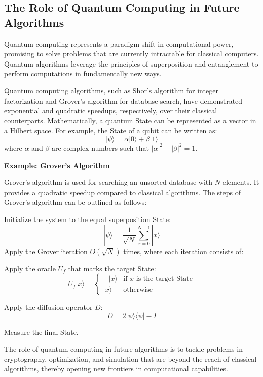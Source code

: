 \documentclass[12pt]{book} %
\begin{document}
\subsection{The Role of Quantum Computing in Future Algorithms}
Quantum computing represents a paradigm shift in computational power, promising to solve problems that are currently intractable for classical computers. Quantum algorithms leverage the principles of superposition and entanglement to perform computations in fundamentally new ways.

Quantum computing algorithms, such as Shor's algorithm for integer factorization and Grover's algorithm for database search, have demonstrated exponential and quadratic speedups, respectively, over their classical counterparts. Mathematically, a quantum State can be represented as a vector in a Hilbert space. For example, the State of a qubit can be written as:
\[
|\psi\rangle = \alpha |0\rangle + \beta |1\rangle
\]
where \(\alpha\) and \(\beta\) are complex numbers such that \(|\alpha|^2 + |\beta|^2 = 1\).

\textbf{Example: Grover's Algorithm}

Grover's algorithm is used for searching an unsorted database with \(N\) elements. It provides a quadratic speedup compared to classical algorithms. The steps of Grover's algorithm can be outlined as follows:
\FloatBarrier
\begin{algorithm}
\caption{Grover's Algorithm}
\begin{algorithmic}[1]
\State Initialize the system to the equal superposition State:
\[
|\psi\rangle = \frac{1}{\sqrt{N}} \sum_{x=0}^{N-1} |x\rangle
\]
\State Apply the Grover iteration \(O(\sqrt{N})\) times, where each iteration consists of:
\begin{item}
    \item Apply the oracle \(U_f\) that marks the target State:
    \[
    U_f |x\rangle = 
    \begin{cases} 
    -|x\rangle & \text{if } x \text{ is the target State} \\
    |x\rangle & \text{otherwise}
    \end{cases}
    \]
    \item Apply the diffusion operator \(D\):
    \[
    D = 2|\psi\rangle\langle\psi| - I
    \]
\end{item}
\State Measure the final State.
\end{algorithmic}
\end{algorithm}
\FloatBarrier
The role of quantum computing in future algorithms is to tackle problems in cryptography, optimization, and simulation that are beyond the reach of classical algorithms, thereby opening new frontiers in computational capabilities.
\end{document}
